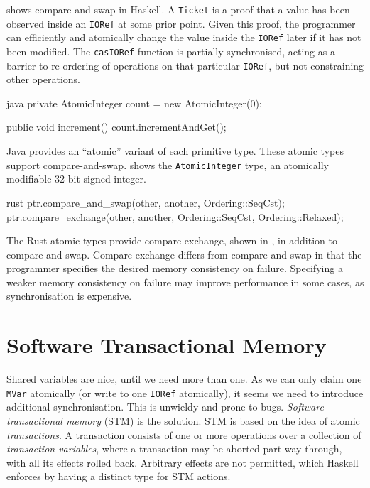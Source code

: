  shows compare-and-swap in Haskell.  A
\verb|Ticket| is a proof that a value has been observed inside an
\verb|IORef| at some prior point.  Given this proof, the programmer
can efficiently and atomically change the value inside the
\verb|IORef| later if it has not been modified.  The \verb|casIORef|
function is partially synchronised, acting as a barrier to re-ordering
of operations on that particular \verb|IORef|, but not constraining
other operations.

\begin{listing}
\centering
\begin{cminted}{java}
private AtomicInteger count = new AtomicInteger(0);

public void increment() {
  count.incrementAndGet();
}
\end{cminted}
\caption{Compare-and-swap in Java.}\label{lst:cas_java}
\end{listing}

Java provides an ``atomic'' variant of each primitive type.  These
atomic types support compare-and-swap.   shows the
\verb|AtomicInteger| type, an atomically modifiable 32-bit signed
integer.

\begin{listing}
\centering
\begin{cminted}{rust}
ptr.compare_and_swap(other, another, Ordering::SeqCst);
ptr.compare_exchange(other, another, Ordering::SeqCst, Ordering::Relaxed);
\end{cminted}
\caption{Compare-and-swap in Rust.}\label{lst:cas_rust}
\end{listing}

The Rust atomic types provide compare-exchange, shown in
, in addition to compare-and-swap.
Compare-exchange differs from compare-and-swap in that the programmer
specifies the desired memory consistency on failure.  Specifying a
weaker memory consistency on failure may improve performance in some
cases, as synchronisation is expensive.

\section{Software Transactional Memory}
\label{sec:concurrent_haskell-stm}

Shared variables are nice, until we need more than one.  As we can
only claim one \verb|MVar| atomically (or write to one \verb|IORef|
atomically), it seems we need to introduce additional synchronisation.
This is unwieldy and prone to bugs.  \emph{Software transactional
  memory} (STM) \parencite{harris2005,shavit1995} is the solution.  STM is
based on the idea of atomic \emph{transactions}.  A transaction
consists of one or more operations over a collection of
\emph{transaction variables}, where a transaction may be aborted
part-way through, with all its effects rolled back.  Arbitrary effects
are not permitted, which Haskell enforces by having a distinct type
for STM actions.

